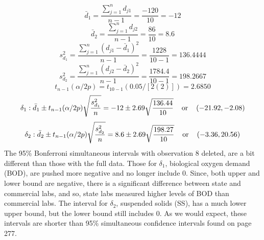 \[
    \bar{d}_{1}
    =
    \frac{ \sum_{j=1}^{n}{ d_{j1} } }{n-1}
    =
    \frac{-120}{10}
    =
    -12
\]
\[
    \bar{d}_{2}
    =
    \frac{ \sum_{j=1}^{n}{ d_{j2} } }{n-1}
    =
    \frac{86}{10}
    =
    8.6
\]
\[
    s_{d_{1}}^{2}
    =
    \frac{ \sum_{j=1}^{n}{( d_{j1} - \bar{d}_{1} )}^{2} }{n-1}
    =
    \frac{1228}{10 - 1}
    =
    136.4444
\]
\[
    s_{d_{2}}^{2}
    =
    \frac{ \sum_{j=1}^{n}{( d_{j2} - \bar{d}_{2} )}^{2} }{n-1}
    =
    \frac{1784.4}{10 - 1}
    =
    198.2667
\]
\[
    t_{n-1}(\alpha/2p)
    =
    t_{10-1}(0.05/[2(2)])
    =
    2.6850
\]
\[
    \delta_{1}:
    \bar{d}_{1}
    \pm
    t_{n - 1}(\alpha/2p)
    \sqrt{ \frac{ s_{d_{1}}^{2} }{n} }
    =
    -12
    \pm
    2.69
    \sqrt{ \frac{ 136.44 }{ 10 } }
    \hspace{0.4cm}\text{or}\hspace{0.4cm}
    (-21.92, -2.08)
\]
\[
    \delta_{2}:
    \bar{d}_{2}
    \pm
    t_{n - 1}(\alpha/2p)
    \sqrt{ \frac{ s_{d_{2}}^{2} }{n} }
    =
    8.6
    \pm
    2.69
    \sqrt{ \frac{ 198.27 }{ 10 } }
    \hspace{0.4cm}\text{or}\hspace{0.4cm}
    (-3.36, 20.56)
\]
The 95\% Bonferroni simultaneous intervals with observation 8 deleted, are a bit different than those with the full data.
Those for $\delta_{1}$, biological oxygen demand (BOD), are pushed more negative and no longer include 0.
Since, both upper and lower bound are negative, there is a significant difference between state and commercial labs, and so, state labs measured higher levels of BOD than commercial labs.
The interval for $\delta_{2}$, suspended solids (SS), has a much lower upper bound, but the lower bound still includes 0.
As we would expect, these intervals are shorter than 95\% simultaneous confidence intervals found on page 277.